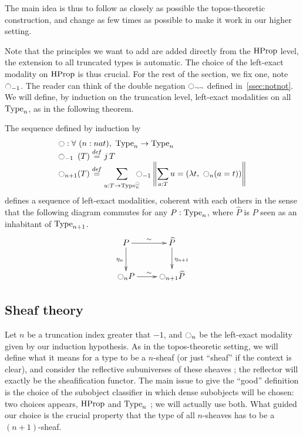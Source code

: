 The main idea is thus to follow as closely as possible the
topos-theoretic construction, and change as few times as possible to
make it work in our higher setting.

Note that the principles we want to add are added directly from the
$\operatorname{HProp}$ level, the extension to all truncated types is automatic. The
choice of the left-exact modality on $\operatorname{HProp}$ is thus crucial. For the
rest of the section, we fix one, note $\ocircle_{-1}$. The reader can
think of the double negation $\ocircle_{\lnot\lnot}$ defined
in~\ref{ssec:notnot}. We will define, by induction on the truncation
level, left-exact modalities on all $\operatorname{Type}_n$, as in the following
theorem.

\begin{thm}\label{thm:main}
  The sequence defined by induction by
  \[ \begin{array}{l}
   \ocircle : \forall \ (n : nat), \ \operatorname{Type}_n \to \operatorname{Type}_n 
   \\
    \ocircle_{-1\phantom{n}}(T) \overset{de\hspace{-0.2ex}f}{=} \mathop{j} T \\

      \displaystyle{\ensuremath{\ocircle}_{n+1}(T)} \overset{de\hspace{-0.2ex}f}{=}  
      \displaystyle{\sum_{u:T \to \operatorname{Type}_n^{\ensuremath{\ocircle}}} \!\!\!\!\ensuremath{\ocircle}_{-1} 
      \left\|
      \sum_{a:T} u= (\lambda t,~\ensuremath{\ocircle}_n (a=t))
      \right\|}
    \end{array}
\]
defines a sequence of left-exact modalities, coherent with each others
in the sense that the following diagram commutes for any $P:\operatorname{Type}_n$,
where $\hat P$ is $P$ seen as an inhabitant of $\operatorname{Type}_{n+1}$.
\[ \xymatrix{
    P \ar@{->}^{\sim}[r] \ar[d]_{\eta_{n}} & \widehat P \ar[d]^{\eta_{n+1}} \\
    \modal_{n} P \ar@{->}^{\sim}[r] & \modal_{n+1} \widehat P 
  } \]
\end{thm}

\subsection{Sheaf theory}
\label{ssec:sheaves}

Let $n$ be a truncation index greater that $-1$, and $\ocircle_n$ be the
left-exact modality given by our induction hypothesis. As in the
topos-theoretic setting, we will define what it means for a type to be
a $n$-sheaf (or just ``sheaf'' if the context is clear), and consider
the reflective subuniverses of these sheaves ; the reflector will
exactly be the sheafification functor.
The main issue to give the ``good'' definition is the choice of the
subobject classifier in which dense subobjects will be chosen: two
choices appears, $\operatorname{HProp}$ and $\operatorname{Type}_n$ ; we will actually use
both. What guided our choice is the crucial property that the type of
all $n$-sheaves has to be a $(n+1)$-sheaf.


